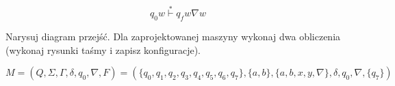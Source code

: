 \documentclass[leqno]{article}
\begin{document}
            \begin{equation}
                q_0w\overset{*}{\vdash}q_f w \nabla w
            \end{equation}

            Narysuj diagram przejść. Dla zaprojektowanej maszyny wykonaj 
            dwa obliczenia (wykonaj rysunki taśmy i zapisz konfiguracje).

            \begin{equation}
                M = (Q, \Sigma, \Gamma, \delta, q_0, \nabla, F) = (
                    \{q_0, q_1, q_2, q_3, q_4, q_5, q_6, q_7\}, 
                    \{a, b\}, 
                    \{a, b, x, y, \nabla\}, 
                    \delta, 
                    q_0, 
                    \nabla, 
                    \{q_7\}
                )
            \end{equation}
\end{document}
